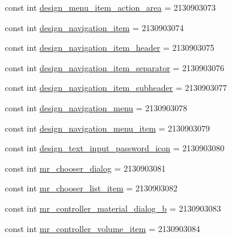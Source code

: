 \begin{DoxyCompactItemize}
\item 
const int \mbox{\hyperlink{class_f_w_p_s___app_1_1_droid_1_1_resource_1_1_layout_a2cbf111766348947aae7a1400088e50d}{design\+\_\+menu\+\_\+item\+\_\+action\+\_\+area}} = 2130903073
\item 
const int \mbox{\hyperlink{class_f_w_p_s___app_1_1_droid_1_1_resource_1_1_layout_a5b33e9d3d131e38964b468844c75fd7e}{design\+\_\+navigation\+\_\+item}} = 2130903074
\item 
const int \mbox{\hyperlink{class_f_w_p_s___app_1_1_droid_1_1_resource_1_1_layout_a7297d83b04704c6357a794f98538ec24}{design\+\_\+navigation\+\_\+item\+\_\+header}} = 2130903075
\item 
const int \mbox{\hyperlink{class_f_w_p_s___app_1_1_droid_1_1_resource_1_1_layout_a41c58b645296f8ea58920542d6ad13a6}{design\+\_\+navigation\+\_\+item\+\_\+separator}} = 2130903076
\item 
const int \mbox{\hyperlink{class_f_w_p_s___app_1_1_droid_1_1_resource_1_1_layout_aa7b694b78226ca86781d1453c056a5cd}{design\+\_\+navigation\+\_\+item\+\_\+subheader}} = 2130903077
\item 
const int \mbox{\hyperlink{class_f_w_p_s___app_1_1_droid_1_1_resource_1_1_layout_ac4f3525adcd76748c3fc3270a9813bf3}{design\+\_\+navigation\+\_\+menu}} = 2130903078
\item 
const int \mbox{\hyperlink{class_f_w_p_s___app_1_1_droid_1_1_resource_1_1_layout_aeee15fac173d48599bbae8104bb0a0e7}{design\+\_\+navigation\+\_\+menu\+\_\+item}} = 2130903079
\item 
const int \mbox{\hyperlink{class_f_w_p_s___app_1_1_droid_1_1_resource_1_1_layout_a4351add5dcf96316bd1681e9abf293f7}{design\+\_\+text\+\_\+input\+\_\+password\+\_\+icon}} = 2130903080
\item 
const int \mbox{\hyperlink{class_f_w_p_s___app_1_1_droid_1_1_resource_1_1_layout_a3827d97db304bf6695452ee30dfdf165}{mr\+\_\+chooser\+\_\+dialog}} = 2130903081
\item 
const int \mbox{\hyperlink{class_f_w_p_s___app_1_1_droid_1_1_resource_1_1_layout_a7fee8fd973756f0b934122dd37a8a517}{mr\+\_\+chooser\+\_\+list\+\_\+item}} = 2130903082
\item 
const int \mbox{\hyperlink{class_f_w_p_s___app_1_1_droid_1_1_resource_1_1_layout_a1406f0595e140fc85a09e5930d8a041a}{mr\+\_\+controller\+\_\+material\+\_\+dialog\+\_\+b}} = 2130903083
\item 
const int \mbox{\hyperlink{class_f_w_p_s___app_1_1_droid_1_1_resource_1_1_layout_ae451c4002e8f5b4f73bf528ea7797c5e}{mr\+\_\+controller\+\_\+volume\+\_\+item}} = 2130903084

\end{DoxyCompactItemize}
